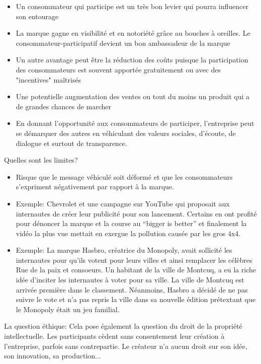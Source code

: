 \begin{itemize}
    \item Un consommateur qui participe est un très bon levier qui pourra influencer son entourage
    \item La marque gagne en visibilité et en notoriété grâce au bouches à oreilles. Le consommateur-participatif devient un bon ambassadeur de la marque
    \item Un autre avantage peut être la réduction des coûts puisque la participation des consommateurs est souvent apportée gratuitement ou avec des "incentives" maîtrisés
    \item Une potentielle augmentation des ventes ou tout du moins un produit qui a de grandes chances de marcher
    \item En donnant l'opportunité aux consommateurs de participer, l'entreprise peut se démarquer des autres en véhiculant des valeurs sociales, d'écoute, de dialogue et surtout de transparence.\\
\end{itemize}

Quelles sont les limites?

\begin{itemize}
    \item Risque que le message véhiculé soit déformé et que les consommateurs s'expriment négativement par rapport à la marque.
    \item Exemple: Chevrolet et une campagne sur YouTube qui proposait aux internautes de créer leur publicité pour son lancement. Certains en ont profité pour dénoncer la marque et la course au “bigger is better” et finalement la vidéo la plus vue mettait en exergue la pollution causée par les gros 4x4.
    \item Exemple: La marque Hasbro, créatrice du Monopoly, avait sollicité les internautes pour qu’ils votent pour leurs villes et ainsi remplacer les célèbres Rue de la paix et consoeurs. Un habitant de la ville de Montcuq, a eu la riche idée d’inciter les internautes à voter pour sa ville. La ville de Montcuq est arrivée première dans le classement. Néanmoins, Hasbro a décidé de ne pas suivre le vote et n’a pas repris la ville dans sa nouvelle édition prétextant que le Monopoly était un jeu familial.\\
\end{itemize}

La question éthique: Cela pose également la question du droit de la propriété intellectuelle. Les participants cèdent sans consentement leur création à l'entreprise, parfois sans contrepartie. Le créateur n'a aucun droit sur son idée, son innovation, sa production...\\

